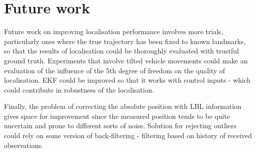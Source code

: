 \section{Future work}
Future work on improving localisation performance involves more trials, particularly ones where the true trajectory has been fixed to known landmarks, so that the results of localisation could be thoroughly evaluated with trustful ground truth. Experiments that involve tilted vehicle movements could make an evaluation of the influence of the 5th degree of freedom on the quality of localisation. EKF could be improved so that it works with control inputs - which could contribute in robustness of the localisation. 

Finally, the problem of correcting the absolute position with LBL information gives space for improvement since the measured position tends to be quite uncertain and prone to different sorts of noise. Solution for rejecting outliers could rely on some version of back-filtering - filtering based on history of received observations.          